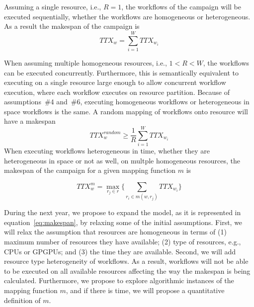 Assuming a single resource, i.e., $R = 1$, the workflows of the campaign will be executed sequentially, whether the workflows are homogeneous or heterogeneous.
As a result the makespan of the campaign is
\begin{equation}
   TTX_{w} = \sum_{i=1}^{W}TTX_{w_{i}} 
\end{equation}

When assuming multiple homogeneous resources, i.e., $1 < R < W$, the workflows can be executed concurrently.
Furthermore, this is semantically equivalent to executing on a single resource large enough to allow concurrent workflow execution, where each workflow executes on resource partition. 
Because of assumptions~\#4 and~\#6, executing homogeneous workflows or heterogeneous in space workflows is the same.
A random mapping of workflows onto resource will have a makespan
\begin{equation}
   TTX_{w}^{random} \geq \frac{1}{R}\sum_{i=1}^{W} TTX_{w_{i}} 
\end{equation}
When executing workflows heterogeneous in time, whether they are heterogeneous in space or not as well, on multple homogeneous resources, the makespan of the campaign for a given mapping function $ m $ is

\begin{equation}
TTX_{w}^{m} = \max_{r_{j}\in r}\Big\{\sum_{r_{i}\in m(w,r_{j})}TTX_{w_{i}}\Big\}
\label{eq:makespan}
\end{equation}

During the next year, we propose to expand the model, as it is represented in equation~\ref{eq:makespan}, by relaxing some of the initial assumptions.
First, we will relax the assumption that resources are homogeneous in terms of (1) maximum number of resources they have available; (2) type of resources, e.g., CPUs or GPGPUs; and (3) the time they are available.
Second, we will add resource type heterogeneity of workflows.
As a result, workflows will not be able to be executed on all available resources affecting the way the makespan is being calculated.
Furthermore, we propose to explore algorithmic instances of the mapping function $ m $, and if there is time, we will propose a quantitative definition of $ m $.


